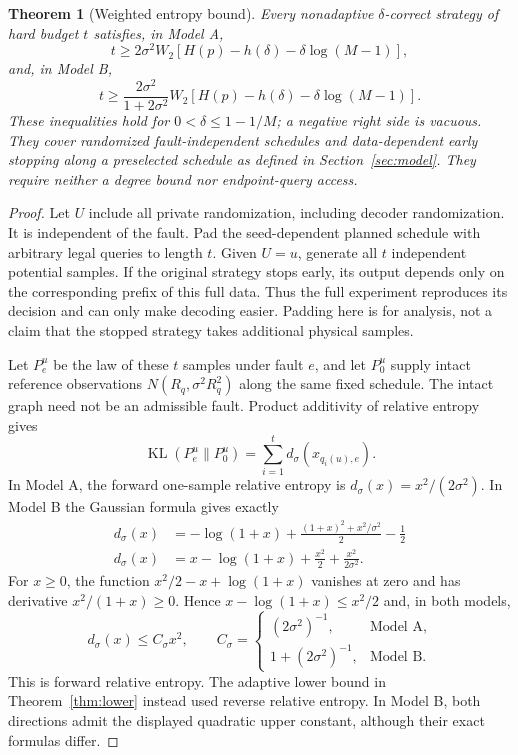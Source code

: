 \documentclass[11pt,letterpaper]{article}
\newtheorem{theorem}{Theorem}
\DeclareMathOperator{\KL}{KL}
\begin{document}
\begin{theorem}[Weighted entropy bound]\label{thm:nonadaptive}
Every nonadaptive $\delta$-correct strategy of hard budget $t$ satisfies, in Model A,
\[
 t\ge2\sigma^2W_2\left[H(p)-h(\delta)-\delta\log(M-1)\right],
\]
and, in Model B,
\[
 t\ge\frac{2\sigma^2}{1+2\sigma^2}W_2
       \left[H(p)-h(\delta)-\delta\log(M-1)\right].
\]
These inequalities hold for $0<\delta\le1-1/M$; a negative right side is vacuous. They cover randomized fault-independent schedules and data-dependent early stopping along a preselected schedule as defined in Section~\ref{sec:model}. They require neither a degree bound nor endpoint-query access.
\end{theorem}
\begin{proof}
Let $U$ include all private randomization, including decoder randomization. It is independent of the fault. Pad the seed-dependent planned schedule with arbitrary legal queries to length $t$. Given $U=u$, generate all $t$ independent potential samples. If the original strategy stops early, its output depends only on the corresponding prefix of this full data. Thus the full experiment reproduces its decision and can only make decoding easier. Padding here is for analysis, not a claim that the stopped strategy takes additional physical samples.

Let $P_e^u$ be the law of these $t$ samples under fault $e$, and let $P_0^u$ supply intact reference observations $N(R_q,\sigma^2R_q^2)$ along the same fixed schedule. The intact graph need not be an admissible fault. Product additivity of relative entropy gives
\[
 \KL(P_e^u\|P_0^u)=\sum_{i=1}^t d_\sigma(x_{q_i(u),e}).
\]
In Model A, the forward one-sample relative entropy is $d_\sigma(x)=x^2/(2\sigma^2)$. In Model B the Gaussian formula gives exactly
\[
 \begin{aligned}
 d_\sigma(x)
 &= -\log(1+x)+\frac{(1+x)^2+x^2/\sigma^2}{2}-\frac12\\
 d_\sigma(x)&= x-\log(1+x)+\frac{x^2}{2}+\frac{x^2}{2\sigma^2}.
 \end{aligned}
\]
For $x\ge0$, the function $x^2/2-x+\log(1+x)$ vanishes at zero and has derivative $x^2/(1+x)\ge0$. Hence $x-\log(1+x)\le x^2/2$ and, in both models,
\[
 d_\sigma(x)\le C_\sigma x^2,\qquad
 C_\sigma=
 \begin{cases}
 (2\sigma^2)^{-1},&\text{Model A},\\
 1+(2\sigma^2)^{-1},&\text{Model B}.
 \end{cases}
\]
This is forward relative entropy. The adaptive lower bound in Theorem~\ref{thm:lower} instead used reverse relative entropy. In Model B, both directions admit the displayed quadratic upper constant, although their exact formulas differ.


\end{proof}
\end{document}
